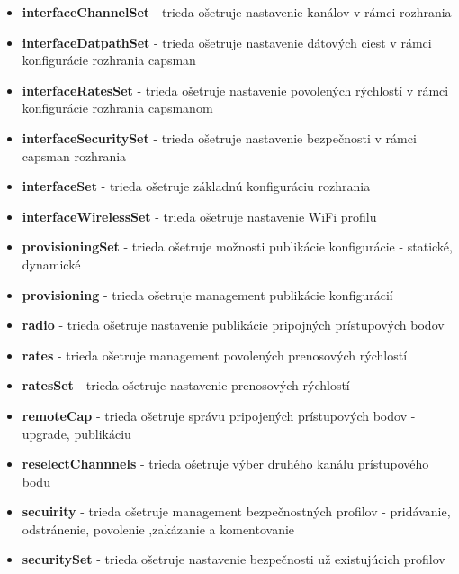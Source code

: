 \begin{itemize}
\item \textbf{interfaceChannelSet} - trieda ošetruje nastavenie kanálov v rámci rozhrania
\item  \textbf{interfaceDatpathSet} - trieda ošetruje nastavenie dátových ciest v rámci konfigurácie rozhrania capsman
\item \textbf{interfaceRatesSet} - trieda ošetruje nastavenie povolených rýchlostí v rámci konfigurácie rozhrania capsmanom
\item  \textbf{interfaceSecuritySet} - trieda ošetruje nastavenie bezpečnosti v rámci capsman rozhrania
\item \textbf{interfaceSet} - trieda ošetruje základnú konfiguráciu rozhrania 
\item \textbf{interfaceWirelessSet} - trieda ošetruje nastavenie WiFi profilu
\item \textbf{provisioningSet} - trieda ošetruje možnosti publikácie konfigurácie - statické, dynamické
\item \textbf{provisioning} - trieda ošetruje management publikácie konfigurácií
\item \textbf{radio} -  trieda ošetruje nastavenie publikácie pripojných prístupových bodov
\item \textbf{rates} - trieda ošetruje management povolených prenosových rýchlostí
\item \textbf{ratesSet} - trieda ošetruje nastavenie prenosových rýchlostí
\item \textbf{remoteCap} - trieda ošetruje správu pripojených prístupových bodov - upgrade, publikáciu
\item \textbf{reselectChannnels} - trieda ošetruje výber druhého kanálu prístupového bodu
\item \textbf{secuirity} - trieda ošetruje management bezpečnostných profilov - pridávanie, odstránenie, povolenie ,zakázanie a komentovanie
\item \textbf{securitySet} - trieda ošetruje nastavenie bezpečnosti už existujúcich profilov
\end{itemize}
